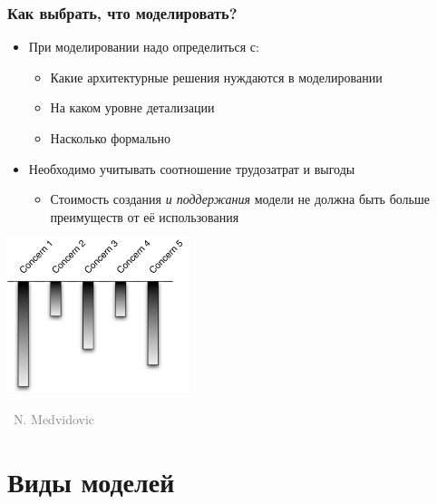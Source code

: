 \documentclass[xetex,mathserif,serif]{beamer}
\newcommand{\attribution}[1] {
    \vspace{-5mm}\begin{flushright}\begin{scriptsize}\textcolor{gray}{\textcopyright\, #1}\end{scriptsize}\end{flushright}
}
\begin{document}
    \begin{frame}
        \frametitle{Как выбрать, что моделировать?}
        \begin{itemize}
            \item При моделировании надо определиться с:
            \begin{itemize}
                \item Какие архитектурные решения нуждаются в моделировании
                \item На каком уровне детализации
                \item Насколько формально
            \end{itemize}
            \item Необходимо учитывать соотношение трудозатрат и выгоды
            \begin{itemize}
                \item Стоимость создания \textit{и поддержания} модели не должна быть больше преимуществ от её использования
            \end{itemize}
        \end{itemize}
        \begin{center}
            \includegraphics[width=0.4\textwidth]{concerns.png}
            \attribution{N. Medvidovic}
        \end{center}
    \end{frame}

    \section{Виды моделей}
\end{document}
